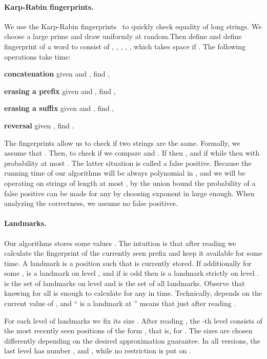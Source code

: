 \documentclass{article}[11pt,letter]
\newenvironment{mydesc}[1]{\begin{list}{}{\settowidth{\labelwidth}{#1}
    \setlength{\labelsep}{0.5cm}
    \setlength{\leftmargin}{\labelwidth}
    \addtolength{\leftmargin}{\labelsep}
    \setlength{\rightmargin}{0pt}
    \setlength{\parsep}{0.5ex plus0.2ex minus0.1ex}
    \setlength{\itemsep}{0ex plus0.2ex}
    }
  }
{\end{list}}
\begin{document}
\paragraph{Karp-Rabin fingerprints.} We use the Karp-Rabin fingerprints~\cite{KR} to quickly check equality of long strings. We choose a large prime 
and draw  uniformly at random.Then define 
and define fingerprint  of a word  to consist of , , , , ,
which takes  space if .
The following operations take  time:
\begin{mydesc}{\bf erasing a suffix}
\item[\bf concatenation] given  and , find ,
\item[\bf erasing a prefix] given  and , find ,
\item[\bf erasing a suffix] given  and , find ,
\item[\bf reversal] given , find .
\end{mydesc}

The fingerprints allow us to check if two strings are the same. Formally, we assume that . Then,
to check if  we compare  and .
If  then , and if  while  then  with probability at most .
The latter situation is called a false positive. Because the running time of our algorithms will be always polynomial in , and we will
be operating on strings of length at most , by the union bound the probability of a false positive can be made 
for any  by choosing exponent in  large enough. When analyzing the correctness, we assume no false positives.

\paragraph{Landmarks.} Our algorithms stores some values .
The intuition is that after reading  we calculate
the fingerprint of the currently seen prefix and keep it available for some time.
A landmark is a position  such that  is currently stored.
If additionally  for some ,  is a landmark on
level , and if  is odd then  is a landmark strictly on level
.  is the set of landmarks on level 
and  is the set of all landmarks. Observe that knowing
 for all  is enough to calculate
 for any  in  time.
Technically,  depends on the current value of , and
`` is a landmark at '' means that  just after reading .

For each level of landmarks we fix its size . After reading , the
-th level consists of the  most recently seen positions of the form ,
that is,  for .
The sizes  are chosen differently depending on the desired approximation guarantee.
In all versions, the last level has number , and , while no restriction is put on .
\end{document}
